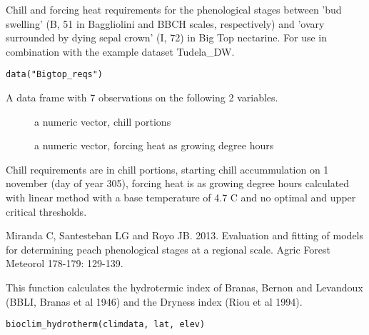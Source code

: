 \documentclass[a4paper]{book}
\begin{document}
%
\begin{Description}\relax
Chill and forcing heat requirements for the phenological stages between
'bud swelling' (B, 51 in Baggliolini and BBCH scales, respectively) and 'ovary 
surrounded by dying sepal crown' (I, 72) in Big Top nectarine. For use in 
combination with the example dataset Tudela\_DW.
\end{Description}
%
\begin{Usage}
\begin{verbatim}
data("Bigtop_reqs")
\end{verbatim}
\end{Usage}
%
\begin{Format}
A data frame with 7 observations on the following 2 variables.
\begin{description}

\item[] a numeric vector, chill portions
\item[] a numeric vector, forcing heat as growing degree hours

\end{description}

\end{Format}
%
\begin{Details}\relax
Chill requirements are in chill portions, starting chill accummulation on 1 november
(day of year 305), forcing heat is as growing degree hours calculated with linear 
method with a base temperature of 4.7 C and no optimal and upper critical thresholds.
\end{Details}
%
\begin{Source}\relax
Miranda C, Santesteban LG and Royo JB. 2013. Evaluation and fitting of models for
determining peach phenological stages at a regional scale. Agric Forest Meteorol 
178-179: 129-139.
\end{Source}
%
\begin{Description}\relax
This function calculates the hydrotermic index of Branas, Bernon and 
Levandoux (BBLI, Branas et al 1946) and the Dryness index (Riou et al 1994).
\end{Description}
%
\begin{Usage}
\begin{verbatim}
bioclim_hydrotherm(climdata, lat, elev)
\end{verbatim}
\end{Usage}
\end{document}
